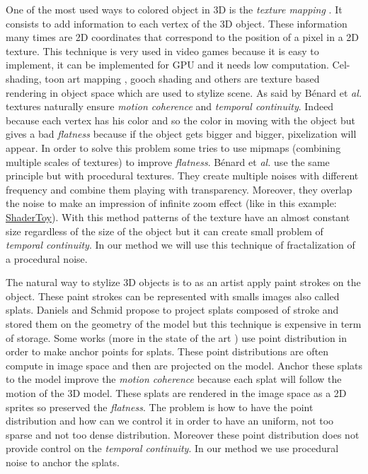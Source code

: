 One of the most used ways to colored object in 3D is the \textit{texture mapping} \cite{texture_mapping}. It consists to add information to each vertex of the 3D object. These information many times are 2D coordinates that correspond to the position of a pixel in a 2D texture. This technique is very used in video games because it is easy to implement, it can be implemented for GPU and it needs low computation. Cel-shading, toon art mapping , gooch shading and others\cite{benard_state---art_2011} are texture based rendering in object space\cite{praun_real-time_2001, klein_non-photorealistic_2000, benard_dynamic_2009, benard_dynamic_2010, freudenberg_walk-through_2001} which are used to stylize scene. As said by Bénard et \textit{al.} \cite{benard_dynamic_2009} textures naturally ensure \textit{motion coherence} and \textit{temporal continuity}. Indeed because each vertex has his color and so the color in moving with the object but gives a bad \textit{flatness} because if the object gets bigger and bigger, pixelization will appear. In order to solve this problem some\cite{klein_non-photorealistic_2000, benard_dynamic_2009} tries to use mipmaps (combining multiple scales of textures) to improve \textit{flatness}. Bénard et \textit{al.}\cite{benard_dynamic_2010} use the same principle but with procedural textures. They create multiple noises with different frequency and combine them playing with transparency. Moreover, they overlap the noise to make an impression of infinite zoom effect (like in this example: \href{https://www.shadertoy.com/view/XlBXWw?fbclid=IwAR1fU2JxQzXtks1ZcmVmzrHiv646G8w2gWceeiV-UToeFkAFMQ2NecbsGGs}{ShaderToy}). With this method patterns of the texture have an almost constant size regardless of the size of the object but it can create small problem of \textit{temporal continuity}. In our method we will use this technique of fractalization of a procedural noise.




The natural way to stylize 3D objects is to as an artist apply paint strokes on the object. These paint strokes can be represented with smalls images also called splats. Daniels\cite{Daniels_1999} and Schmid\cite{schmid_overcoat} propose to project splats composed of stroke and stored them on the geometry of the model but this technique is expensive in term of storage. Some works \cite{meier_painterly_1996, Fekete_2000, chi_stylized_2006}(more in the state of the art \cite{benard_state---art_2011}) use point distribution in order to make anchor points for splats. These point distributions are often compute in image space and then are projected on the model. Anchor these splats to the model improve the \textit{motion coherence} because each splat will follow the motion of the 3D model. These splats are rendered in the image space as a 2D sprites so preserved the \textit{flatness}. The problem is how to have the point distribution and how can we control it in order to have an uniform, not too sparse and not too dense distribution. Moreover these point distribution does not provide control on the \textit{temporal continuity}. In our method we use procedural noise to anchor the splats.

